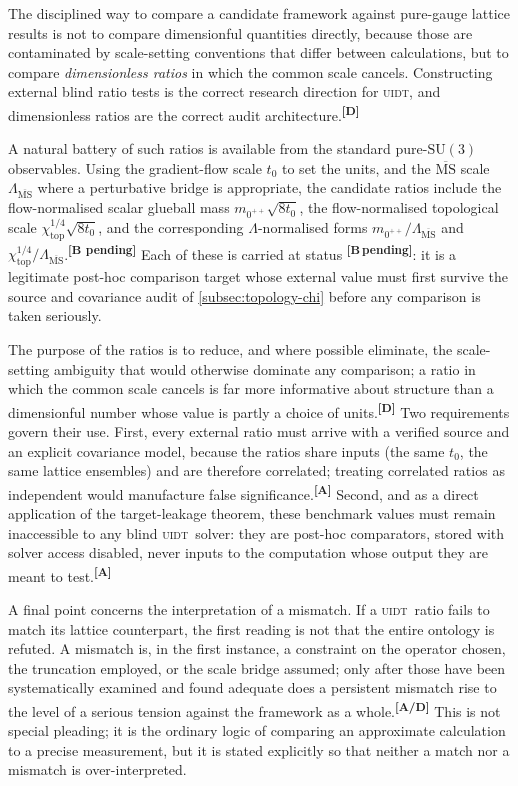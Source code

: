 \documentclass[12pt,a4paper,twoside]{article}
\theoremstyle{plain}
\theoremstyle{definition}
\theoremstyle{remark}
\newcommand{\UIDT}{\textsc{uidt}}
\newcommand{\catmark}[1]{\textsuperscript{\textsf{\textbf{[#1]}}}}
\newcommand{\Bpending}{\catmark{B\,pending}}
\begin{document}
The disciplined way to compare a candidate framework against pure-gauge lattice results is not to compare dimensionful quantities directly, because those are contaminated by scale-setting conventions that differ between calculations, but to compare \emph{dimensionless ratios} in which the common scale cancels. Constructing external blind ratio tests is the correct research direction for \UIDT, and dimensionless ratios are the correct audit architecture.\catmark{D}

A natural battery of such ratios is available from the standard pure-$\mathrm{SU}(3)$ observables. Using the gradient-flow scale $t_0$ to set the units, and the $\overline{\mathrm{MS}}$ scale $\Lambda_{\overline{\mathrm{MS}}}$ where a perturbative bridge is appropriate, the candidate ratios include the flow-normalised scalar glueball mass $m_{0^{++}}\sqrt{8t_0}$, the flow-normalised topological scale $\chi_{\mathrm{top}}^{1/4}\sqrt{8t_0}$, and the corresponding $\Lambda$-normalised forms $m_{0^{++}}/\Lambda_{\overline{\mathrm{MS}}}$ and $\chi_{\mathrm{top}}^{1/4}/\Lambda_{\overline{\mathrm{MS}}}$.\catmark{B pending} Each of these is carried at status \Bpending: it is a legitimate post-hoc comparison target whose external value must first survive the source and covariance audit of \cref{subsec:topology-chi} before any comparison is taken seriously.

The purpose of the ratios is to reduce, and where possible eliminate, the scale-setting ambiguity that would otherwise dominate any comparison; a ratio in which the common scale cancels is far more informative about structure than a dimensionful number whose value is partly a choice of units.\catmark{D} Two requirements govern their use. First, every external ratio must arrive with a verified source and an explicit covariance model, because the ratios share inputs (the same $t_0$, the same lattice ensembles) and are therefore correlated; treating correlated ratios as independent would manufacture false significance.\catmark{A} Second, and as a direct application of the target-leakage theorem, these benchmark values must remain inaccessible to any blind \UIDT\ solver: they are post-hoc comparators, stored with solver access disabled, never inputs to the computation whose output they are meant to test.\catmark{A}

A final point concerns the interpretation of a mismatch. If a \UIDT\ ratio fails to match its lattice counterpart, the first reading is not that the entire ontology is refuted. A mismatch is, in the first instance, a constraint on the operator chosen, the truncation employed, or the scale bridge assumed; only after those have been systematically examined and found adequate does a persistent mismatch rise to the level of a serious tension against the framework as a whole.\catmark{A/D} This is not special pleading; it is the ordinary logic of comparing an approximate calculation to a precise measurement, but it is stated explicitly so that neither a match nor a mismatch is over-interpreted.
\end{document}
